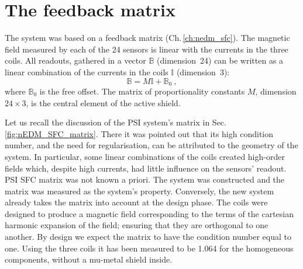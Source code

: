 \section{The feedback matrix}
The system was based on a feedback matrix (Ch.\,\ref{ch:nedm_sfc}).
The magnetic field measured by each of the 24 sensors is linear with the currents in the three coils.
All readouts, gathered in a vector $\mathbb{B}$ (dimension~24) can be written as a linear combination of the currents in the coils $\mathbb{I}$ (dimension~3):
\begin{equation}
  \label{eq:SFC_matrix_model}
  \mathbb{B} = M \mathbb{I} + \mathbb{B}_0 \ ,
\end{equation}
where $\mathbb{B}_0$ is the free offset.
The matrix of proportionality constants $M$, dimension $24 \times 3$, is the central element of the active shield.

Let us recall the discussion of the PSI system's matrix in Sec.\,\ref{fig:nEDM_SFC_matrix}.
There it was pointed out that its high condition number, and the need for regularisation, can be attributed to the geometry of the system.
In particular, some linear combinations of the coils created high-order fields which, despite high currents, had little influence on the sensors' readout.
PSI SFC matrix was not known a priori.
The system was constructed and the matrix was measured as the system's property. 
Conversely, the new system already takes the matrix into account at the design phase.
The coils were designed to produce a magnetic field corresponding to the terms of the cartesian harmonic expansion of the field; 
ensuring that they are orthogonal to one another.
By design we expect the matrix to have the condition number equal to one.
Using the three coils it has been measured to be \num{1.064} for the homogeneous components, without a mu-metal shield inside.


